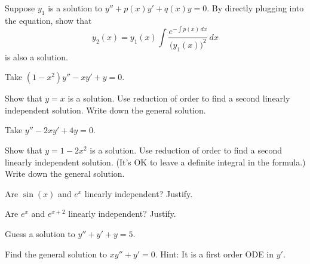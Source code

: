 \begin{exercise} \label{exercise:reductionoforder}
Suppose $y_1$ is a solution to $y'' + p(x) y' + q(x) y = 0$.
By directly plugging into the equation,
show that
\begin{equation*}
y_2(x) = y_1(x) \int \frac{e^{-\int p(x)\,dx}}{{\bigl(y_1(x)\bigr)}^2} \,dx
\end{equation*}
is also a solution.
\end{exercise}

\begin{exercise}
Take 
$(1-x^2)y''-xy' + y = 0$.
\begin{tasks}
\task Show that $y=x$ is a solution.
\task Use reduction of order to find a second linearly independent solution.
\task Write down the general solution.
\end{tasks}
\end{exercise}

\begin{exercise}
Take 
$y''-2xy' + 4y = 0$.
\begin{tasks}
\task Show that $y=1-2x^2$ is a solution.  
\task Use reduction of order to find a second linearly independent solution.
(It's OK to leave a definite integral in the formula.)
\task Write down the general solution.
\end{tasks}
\end{exercise}

\setcounter{exercise}{100}

\begin{exercise}
Are $\sin(x)$ and $e^x$ linearly independent?  Justify.
\end{exercise}

\begin{exercise}
Are $e^x$ and $e^{x+2}$ linearly independent?  Justify.
\end{exercise}

\begin{exercise}
Guess a solution to $y'' + y' + y= 5$.
\end{exercise}

\begin{exercise}
Find the general solution to
$x y'' + y' = 0$.  Hint: It is a first order ODE in $y'$.
\end{exercise}

